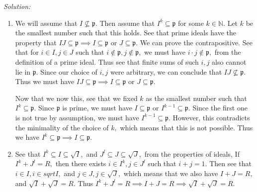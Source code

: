 \documentclass{article}
\begin{document}
\emph{Solution:} \begin{enumerate}
	\item We will assume that $I \nsubseteq \mathfrak{p}.$ Then assume that $I^k \subseteq \mathfrak{p}$ for some $k \in \mathbb{N}.$ Let $k$ be the smallest number 
	such that this holds. See that prime ideals have the property that $IJ \subseteq \mathfrak{p} \implies I \subseteq \mathfrak{p}$ or $J \subseteq \mathfrak{p}.$
	We can prove the contrapositive. See that for $i \in I, j \in J$ such that $i \notin \mathfrak{p}, j \notin \mathfrak{p},$ we must have $i\cdot j \notin \mathfrak{p},$
	from the definition of a prime ideal. Thus see that finite sums of such $i,j$ also cannot lie in $\mathfrak{p}.$ Since our choice of $i,j$ were arbitrary, 
	we can conclude that $IJ \nsubseteq \mathfrak{p}. $ Thus we must have $IJ \subseteq \mathfrak{p} \implies I \subseteq \mathfrak{p} $ or $J \subseteq \mathfrak{p}.$
	
	Now that we now this, see that we fixed $k$ as the smallest number such that $I^k \subseteq \mathfrak{p}.$ Since $\mathfrak{p}$ is prime, we must have 
	$I \subseteq \mathfrak{p}$ or $I^{k-1} \subseteq \mathfrak{p}.$ Since the first one is not true by assumption, we must have $I^{k-1} \subseteq \mathfrak{p}.$ However,
	this contradicts the minimality of the choice of $k,$ which means that this is not possible. Thus we have $I^k \subseteq \mathfrak{p} \implies I \subseteq \mathfrak{p}.$

	\item See that $I^k \subseteq I \subseteq \sqrt{I}, $ and $J^l \subseteq J \subseteq \sqrt{J},$ from the properties of ideals, If $I^k+J^l=R,$ then 
	there exists $i \in I^k, j \in J^l$ such that $ i+j=1.$ Then see that $ i \in I, i \in sqrt{I},$ and $j \in J, j \in \sqrt{J},$ which means that we also have 
	$I+J=R,$ and $\sqrt{I}+\sqrt{J}=R.$ Thus $ I^k+J^l=R \implies I+J=R \implies \sqrt{I}+\sqrt{J}=R.$ 


\end{enumerate}
\end{document}
